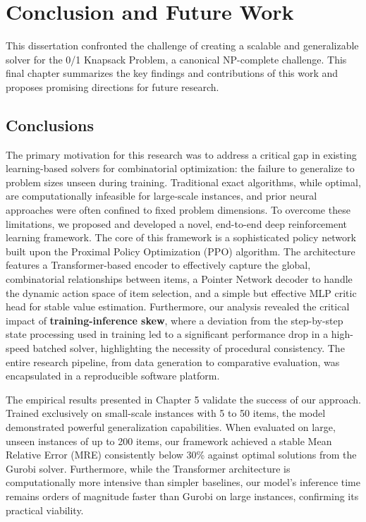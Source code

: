 
\chapter{Conclusion and Future Work}
\label{chap:conclusion_future_work}

This dissertation confronted the challenge of creating a scalable and generalizable solver for the 0/1 Knapsack Problem, a canonical NP-complete challenge.
This final chapter summarizes the key findings and contributions of this work and proposes promising directions for future research.

\section{Conclusions}
\label{sec:conclusions}

The primary motivation for this research was to address a critical gap in existing learning-based solvers for combinatorial optimization: the failure to generalize to problem sizes unseen during training.
Traditional exact algorithms, while optimal, are computationally infeasible for large-scale instances, and prior neural approaches were often confined to fixed problem dimensions.
To overcome these limitations, we proposed and developed a novel, end-to-end deep reinforcement learning framework.
The core of this framework is a sophisticated policy network built upon the Proximal Policy Optimization (PPO) algorithm.
The architecture features a Transformer-based encoder to effectively capture the global, combinatorial relationships between items, a Pointer Network decoder to handle the dynamic action space of item selection, and a simple but effective MLP critic head for stable value estimation.
Furthermore, our analysis revealed the critical impact of \textbf{training-inference skew}, where a deviation from the step-by-step state processing used in training led to a significant performance drop in a high-speed batched solver, highlighting the necessity of procedural consistency.
The entire research pipeline, from data generation to comparative evaluation, was encapsulated in a reproducible software platform.

The empirical results presented in Chapter 5 validate the success of our approach.
Trained exclusively on small-scale instances with 5 to 50 items, the model demonstrated powerful generalization capabilities.
When evaluated on large, unseen instances of up to 200 items, our framework achieved a stable Mean Relative Error (MRE) consistently below 30\% against optimal solutions from the Gurobi solver.
Furthermore, while the Transformer architecture is computationally more intensive than simpler baselines, our model's inference time remains orders of magnitude faster than Gurobi on large instances, confirming its practical viability.

